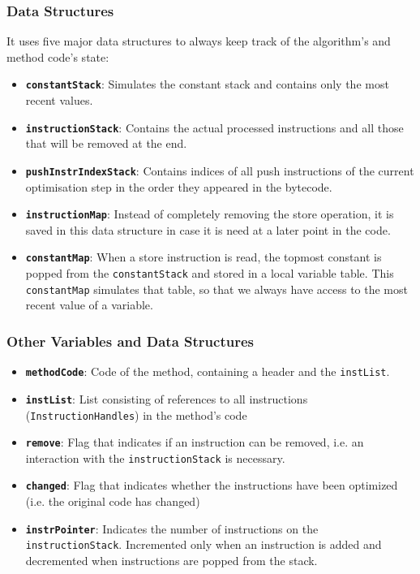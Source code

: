 \subsubsection{Data Structures}
It uses five major data structures to always keep track of the algorithm's and method code's state:

\begin{itemize}
\item \textbf{\texttt{constantStack}}: Simulates the constant stack and contains only the most recent values.
\item \textbf{\texttt{instructionStack}}: Contains the actual processed instructions and all those that will be removed at the end.
\item \textbf{\texttt{pushInstrIndexStack}}: Contains indices of all push instructions of the current optimisation step in the order they appeared in the bytecode.
\item \textbf{\texttt{instructionMap}}: Instead of completely removing the store operation, it is saved in this data structure in case it is need at a later point in the code.
\item \textbf{\texttt{constantMap}}: When a store instruction is read, the topmost constant is popped from the \texttt{\texttt{constantStack}} and stored in a local variable table. This \texttt{constantMap} simulates that table, so that we always have access to the most recent value of a variable.
\end{itemize}

\subsubsection{Other Variables and Data Structures}
\begin{itemize}
\item \textbf{\texttt{methodCode}}: Code of the method, containing a header and the \texttt{instList}.
\item \textbf{\texttt{instList}}: List consisting of references to all instructions (\texttt{InstructionHandles}) in the method's code
\item \textbf{\texttt{remove}}: Flag that indicates if an instruction can be removed, i.e. an interaction with the \texttt{instructionStack} is necessary.
\item \textbf{\texttt{changed}}: Flag that indicates whether the instructions have been optimized (i.e. the original code has changed) 
\item \textbf{\texttt{instrPointer}}: Indicates the number of instructions on the \texttt{instructionStack}. Incremented only when an instruction is added and decremented when instructions are popped from the stack.
\end{itemize}

